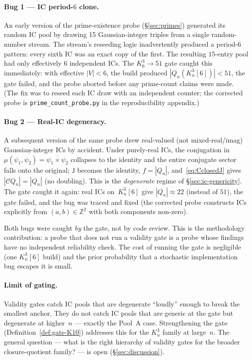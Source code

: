 \documentclass[12pt,a4paper]{article}
\theoremstyle{definition}
\theoremstyle{remark}
\newcommand{\bZ}{\mathbb{Z}}
\newcommand{\Kn}{K_n^3}
\newcommand{\Qn}{Q_n}
\newcommand{\Ccls}{\mathcal{C}}             %
\newcommand{\Jconj}{\mathsf{J}}             %
\begin{document}
\paragraph{Bug 1 --- IC period-$6$ clone.}
An early version of the prime-existence probe (\S\ref{sec:primes})
generated its random IC pool by drawing 15 Gaussian-integer triples
from a single random-number stream. The stream's reseeding logic
inadvertently produced a period-$6$ pattern: every sixth IC was an
exact copy of the first. The resulting $15$-entry pool had only
effectively $6$ independent ICs. The $K_6^3 \to 51$ gate caught this
immediately: with effective $|V| < 6$, the build produced
$|\Qn(\Kn[6])| < 51$, the gate failed, and the probe aborted before
any prime-count claims were made. (The fix was to reseed each IC
draw with an independent counter; the corrected probe is
\texttt{prime\_count\_probe.py} in the reproducibility appendix.)

\paragraph{Bug 2 --- Real-IC degeneracy.}
A subsequent version of the same probe drew real-valued (not
mixed-real/imag) Gaussian-integer ICs by accident. Under purely-real
ICs, the conjugation in $\mu(\psi_1, \psi_2) = \overline{\psi_1 \times
\psi_2}$ collapses to the identity and the entire conjugate sector
falls onto the original; $\Jconj$ becomes the identity, $f = |\Qn|$,
and~\eqref{eq:CclosedJ} gives $|\Ccls\Qn| = |\Qn|$ (no doubling).
This is the \emph{degenerate} regime of \S\ref{sec:ic-genericity}.
The gate caught it again: real ICs on~$\Kn[6]$ give
$|\Qn| \approx 22$ (instead of $51$), the gate failed, and the bug
was traced and fixed (the corrected probe constructs ICs explicitly
from $(a, b) \in \bZ^2$ with both components non-zero).

Both bugs were caught \emph{by} the gate, not by code review. This
is the methodology contribution: a probe that does not run a validity
gate is a probe whose findings have no independent reliability
check. The cost of running the gate is negligible (one $\Kn[6]$
build) and the prior probability that a stochastic implementation
bug escapes it is small.

\paragraph{Limit of gating.}
Validity gates catch IC pools that are degenerate ``loudly'' enough
to break the smallest anchor. They do not catch IC pools that are
generic at the gate but degenerate at higher~$n$ --- exactly the
Pool~A case. Strengthening the gate (Definition~\ref{def:gate-K10})
addresses this for the $\Kn$ family at large~$n$. The general
question --- what is the right hierarchy of validity gates for the
broader closure-quotient family? --- is open
(\S\ref{sec:discussion}).
\end{document}
